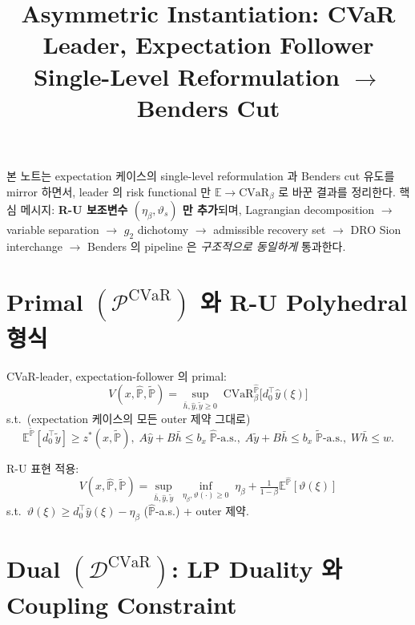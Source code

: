 \documentclass[11pt]{article}
\title{\textbf{Asymmetric Instantiation: CVaR Leader, Expectation Follower}\\[2pt]
\large Single-Level Reformulation $\to$ Benders Cut}
\author{}
\date{}
\newcommand{\E}{\mathbb{E}}
\newcommand{\Phat}{\hat{\mathbb{P}}}
\newcommand{\Ptil}{\tilde{\mathbb{P}}}
\newcommand{\barh}{\bar{h}}
\newcommand{\hatY}{\hat{y}}
\newcommand{\tilY}{\tilde{y}}
\newcommand{\CVaR}{\mathrm{CVaR}}
\theoremstyle{plain}
\theoremstyle{remark}
\begin{document}
\maketitle

본 노트는 expectation 케이스의 single-level reformulation 과 Benders cut 유도를 mirror 하면서, leader 의 risk functional 만 $\E \to \CVaR_\beta$ 로 바꾼 결과를 정리한다. 핵심 메시지: \textbf{R-U 보조변수 $(\eta_\beta, \vartheta_s)$ 만 추가}되며, Lagrangian decomposition $\to$ variable separation $\to$ $g_2$ dichotomy $\to$ admissible recovery set $\to$ DRO Sion interchange $\to$ Benders 의 pipeline 은 \emph{구조적으로 동일하게} 통과한다.


\section{Primal $(\mathcal{P}^{\CVaR})$ 와 R-U Polyhedral 형식}
\label{sec:primal}

CVaR-leader, expectation-follower 의 primal:
\begin{equation}
V(x, \Phat, \Ptil) = \sup_{\barh, \hatY, \tilY \geq 0}\; \CVaR_\beta^{\Phat}\!\big[d_0^\top \hatY(\xi)\big]
\end{equation}
s.t.\ (expectation 케이스의 모든 outer 제약 그대로)
\[
\E^{\Ptil}[d_0^\top \tilY] \geq z^*(x, \Ptil),\;
A\hatY + B\barh \leq b_x\;\Phat\text{-a.s.},\;
A\tilY + B\barh \leq b_x\;\Ptil\text{-a.s.},\;
W\barh \leq w.
\]

R-U 표현 적용:
\begin{equation}\label{eq:polyhedral}
V(x, \Phat, \Ptil) = \sup_{\barh, \hatY, \tilY}\;\inf_{\eta_\beta, \vartheta(\cdot) \geq 0}\; \eta_\beta + \tfrac{1}{1-\beta}\E^{\Phat}[\vartheta(\xi)]
\end{equation}
s.t.\ $\vartheta(\xi) \geq d_0^\top \hatY(\xi) - \eta_\beta$ ($\Phat$-a.s.) + outer 제약.


\section{Dual $(\mathcal{D}^{\CVaR})$: LP Duality 와 Coupling Constraint}
\label{sec:dual}
\end{document}
